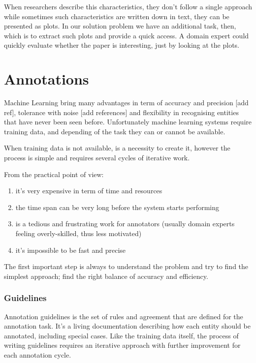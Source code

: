 \documentclass{article}
\begin{document}
When researchers describe this characteristics, they don't follow a single approach while sometimes such characteristics are written down in text, they can be presented as plots. 
In our solution problem we have an additional task, then, which is to extract such plots and provide a quick access. A domain expert could quickly evaluate whether the paper is interesting, just by looking at the plots. 

\section{Annotations}

Machine Learning bring many advantages in term of accuracy and precision [add ref], tolerance with noise [add references] and flexibility in recognising entities that have never been seen before. 
Unfortunately machine learning systems require training data, and depending of the task they can or cannot be available.

When training data is not available, is a necessity to create it, however the process is simple and requires several cycles of iterative work.

From the practical point of view:  
\begin{enumerate}
    \item it's very expensive in term of time and resources
    \item the time span can be very long before the system starts performing
    \item is a tedious and frustrating work for annotators (usually domain experts feeling overly-skilled, thus less motivated)
    \item it's impossible to be fast and precise 
\end{enumerate}
    
The first important step is always to understand the problem and try to find the simplest approach; find the right balance of accuracy and efficiency. 

\subsubsection{Guidelines}

Annotation guidelines is the set of rules and agreement that are defined for the annotation task. It's a living documentation describing how each entity should be annotated, including special cases. 
Like the training data itself, the process of writing guidelines requires an iterative approach with further improvement for each annotation cycle. 
\end{document}
